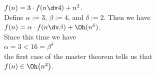 \begin{enumerate}
      \hspace*{1.3cm}
      $f(n) = 3 \cdot f(n \dv 4) + n^2$.
      \\[0.2cm]
      Define $\alpha := 3$, $\beta := 4$, and $\delta := 2$.  Then we have
      \\[0.2cm]
      \hspace*{1.3cm}
      $f(n) = \alpha \cdot f(n \dv \beta) + \Oh(n^\delta)$.
      \\[0.2cm]
      Since this time we have
      \\[0.2cm]
      \hspace*{1.3cm}
      $\alpha = 3 < 16 = \beta^\delta$
      \\[0.2cm]
      the first case of the master theorem tells us that
      \\[0.2cm]
      \hspace*{1.3cm}
      $f(n) \in \Oh\bigl(n^2\bigr)$.
\end{enumerate}

